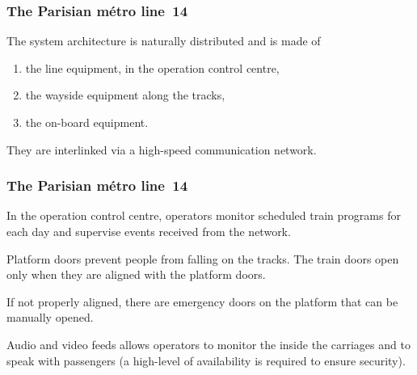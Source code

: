 \documentclass[compress,dvipdfmx]{beamer}
\begin{document}
\begin{frame}
  \frametitle{The Parisian métro line~14}

  The system architecture is naturally distributed and is made of
  \begin{enumerate}

    \item the line equipment, in the operation control centre,

    \item the wayside equipment along the tracks,

    \item the on\hyp{}board equipment.

  \end{enumerate}

  \bigskip

  They are interlinked via a high\hyp{}speed communication network.

\end{frame}


\begin{frame}
  \frametitle{The Parisian métro line~14}

  In the operation control centre, operators monitor scheduled train
  programs for each day and supervise events received from the
  network.

  \bigskip

  Platform doors prevent people from falling on the tracks. The train
  doors open only when they are aligned with the platform doors.

  \bigskip

  If not properly aligned, there are emergency doors on the platform
  that can be manually opened.

  \bigskip

  Audio and video feeds allows operators to monitor the inside the
  carriages and to speak with passengers (a high\hyp{}level of
  availability is required to ensure security).

\end{frame}
\end{document}
